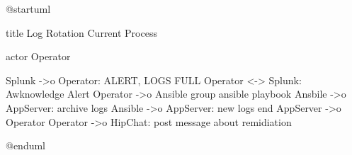 @startuml

title Log Rotation Current Process

actor Operator

Splunk ->o Operator: ALERT, LOGS FULL
Operator <-> Splunk: Awknowledge Alert
Operator ->o Ansible
group ansible playbook
  Ansbile ->o AppServer: archive logs
  Ansible ->o AppServer: new logs
end
AppServer ->o Operator
Operator ->o HipChat: post message about remidiation 

@enduml
